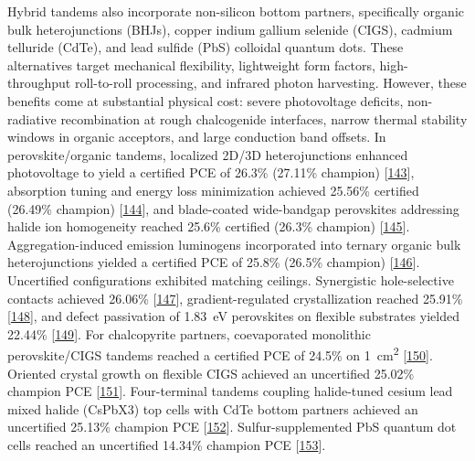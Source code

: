 \documentclass[
  11pt,
]{article}
\begin{document}
Hybrid tandems also incorporate non-silicon bottom partners,
specifically organic bulk heterojunctions (BHJs), copper indium gallium
selenide (CIGS), cadmium telluride (CdTe), and lead sulfide (PbS)
colloidal quantum dots. These alternatives target mechanical
flexibility, lightweight form factors, high-throughput roll-to-roll
processing, and infrared photon harvesting. However, these benefits come
at substantial physical cost: severe photovoltage deficits,
non-radiative recombination at rough chalcogenide interfaces, narrow
thermal stability windows in organic acceptors, and large conduction
band offsets. In perovskite/organic tandems, localized 2D/3D
heterojunctions enhanced photovoltage to yield a certified PCE of 26.3\%
(27.11\% champion)
{[}\href{https://doi.org/10.1038/s41467-026-68904-4}{143}{]}, absorption
tuning and energy loss minimization achieved 25.56\% certified (26.49\%
champion) {[}\href{https://doi.org/10.1007/s40820-025-02037-z}{144}{]},
and blade-coated wide-bandgap perovskites addressing halide ion
homogeneity reached 25.6\% certified (26.3\% champion)
{[}\href{https://doi.org/10.1126/sciadv.aed2200}{145}{]}.
Aggregation-induced emission luminogens incorporated into ternary
organic bulk heterojunctions yielded a certified PCE of 25.8\% (26.5\%
champion) {[}\href{https://doi.org/10.1038/s41467-026-73743-4}{146}{]}.
Uncertified configurations exhibited matching ceilings. Synergistic
hole-selective contacts achieved 26.06\%
{[}\href{https://doi.org/10.1002/aenm.70945}{147}{]}, gradient-regulated
crystallization reached 25.91\%
{[}\href{https://doi.org/10.1002/aenm.71115}{148}{]}, and defect
passivation of \qty{1.83}{\electronvolt} perovskites on flexible
substrates yielded 22.44\%
{[}\href{https://doi.org/10.1002/inf2.70132}{149}{]}. For chalcopyrite
partners, coevaporated monolithic perovskite/CIGS tandems reached a
certified PCE of 24.5\% on \qty{1}{\centi\meter\squared}
{[}\href{https://doi.org/10.1021/acsenergylett.5c04203}{150}{]}.
Oriented crystal growth on flexible CIGS achieved an uncertified 25.02\%
champion PCE {[}\href{https://doi.org/10.1002/aenm.71102}{151}{]}.
Four-terminal tandems coupling halide-tuned cesium lead mixed halide
(CsPbX3) top cells with CdTe bottom partners achieved an uncertified
25.13\% champion PCE
{[}\href{https://doi.org/10.1021/acsaem.6c00408}{152}{]}.
Sulfur-supplemented PbS quantum dot cells reached an uncertified 14.34\%
champion PCE {[}\href{https://doi.org/10.1002/adfm.75664}{153}{]}.
\end{document}
